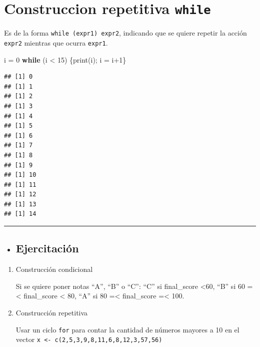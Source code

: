 \documentclass[
]{book}
\newenvironment{Shaded}{\begin{snugshade}}{\end{snugshade}}
\newcommand{\ControlFlowTok}[1]{\textcolor[rgb]{0.13,0.29,0.53}{\textbf{#1}}}
\newcommand{\DecValTok}[1]{\textcolor[rgb]{0.00,0.00,0.81}{#1}}
\newcommand{\FunctionTok}[1]{\textcolor[rgb]{0.00,0.00,0.00}{#1}}
\newcommand{\NormalTok}[1]{#1}
\newcommand{\OtherTok}[1]{\textcolor[rgb]{0.56,0.35,0.01}{#1}}
\newcommand{\SpecialCharTok}[1]{\textcolor[rgb]{0.00,0.00,0.00}{#1}}
\newenvironment{rmdblock}[1]
{\begin{shaded*}
		\begin{itemize}
			\renewcommand{\labelitemi}{
				\raisebox{-.7\height}[0pt][0pt]{
					{\setkeys{Gin}{width=3em,keepaspectratio}\texttt{[image: images/\#1]}}
				}
			}
			\item
		}
		{
		\end{itemize}
	\end{shaded*}
}
\newenvironment{rmdtip}
{\begin{rmdblock}{tip}}
	{\end{rmdblock}}
\begin{document}
\hypertarget{construccion-repetitiva-while}{%
\section{\texorpdfstring{Construccion repetitiva \texttt{while}}{Construccion repetitiva while}}\label{construccion-repetitiva-while}}

Es de la forma \texttt{while\ (expr1)\ expr2}, indicando que se quiere repetir la acción \texttt{expr2} mientras que ocurra \texttt{expr1}.

\begin{Shaded}
\begin{Highlighting}[]
\NormalTok{i }\OtherTok{=} \DecValTok{0}
\ControlFlowTok{while}\NormalTok{ (i }\SpecialCharTok{\textless{}} \DecValTok{15}\NormalTok{) \{}\FunctionTok{print}\NormalTok{(i); i }\OtherTok{=}\NormalTok{ i}\SpecialCharTok{+}\DecValTok{1}\NormalTok{\}}
\end{Highlighting}
\end{Shaded}

\begin{verbatim}
## [1] 0
## [1] 1
## [1] 2
## [1] 3
## [1] 4
## [1] 5
## [1] 6
## [1] 7
## [1] 8
## [1] 9
## [1] 10
## [1] 11
## [1] 12
## [1] 13
## [1] 14
\end{verbatim}

\begin{center}\rule{0.5\linewidth}{0.5pt}\end{center}

\begin{rmdtip}
\hypertarget{ejercitaciuxf3n}{%
\subsection{Ejercitación}\label{ejercitaciuxf3n}}
\end{rmdtip}

\begin{enumerate}
\def\labelenumi{\arabic{enumi}.}
\item
  Construcción condicional

  Si se quiere poner notas ``A'', ``B'' o ``C'': ``C'' si final\_score \textless60, ``B'' si 60 =\textless{} final\_score \textless{} 80, ``A'' si 80 =\textless{} final\_score =\textless{} 100.
\item
  Construcción repetitiva

  Usar un ciclo \texttt{for} para contar la cantidad de números mayores a 10 en el vector \texttt{x\ \textless{}-\ c(2,5,3,9,8,11,6,8,12,3,57,56)}
\end{enumerate}
\end{document}
